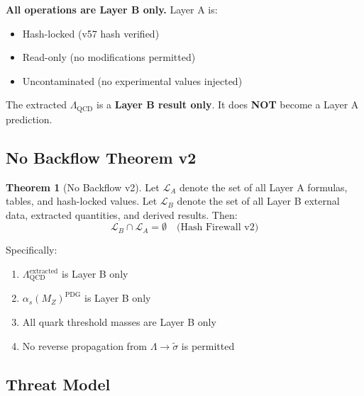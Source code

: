 \documentclass[11pt,a4paper]{article}
\theoremstyle{definition}
\newtheorem{theorem}{Theorem}[section]
\begin{document}
\begin{firewallbox}
\textbf{All operations are Layer B only.} Layer A is:
\begin{itemize}
  \item Hash-locked (v57 hash verified)
  \item Read-only (no modifications permitted)
  \item Uncontaminated (no experimental values injected)
\end{itemize}

The extracted $\Lambda_{\text{QCD}}$ is a \textbf{Layer B result only}.
It does \textbf{NOT} become a Layer A prediction.
\end{firewallbox}

\subsection{No Backflow Theorem v2}
\label{subsec:no-backflow-v2}

\begin{theorem}[No Backflow v2]
\label{thm:no-backflow-v2}
Let $\mathcal{L}_A$ denote the set of all Layer A formulas, tables, and
hash-locked values. Let $\mathcal{L}_B$ denote the set of all Layer B
external data, extracted quantities, and derived results. Then:
\begin{equation}
\label{eq:no-backflow-v2}
\boxed{\mathcal{L}_B \cap \mathcal{L}_A = \emptyset \quad \text{(Hash Firewall v2)}}
\end{equation}

Specifically:
\begin{enumerate}
  \item $\Lambda_{\text{QCD}}^{\text{extracted}}$ is Layer B only
  \item $\alpha_s(M_Z)^{\text{PDG}}$ is Layer B only
  \item All quark threshold masses are Layer B only
  \item No reverse propagation from $\Lambda \to \tilde{\sigma}$ is permitted
\end{enumerate}
\end{theorem}

\subsection{Threat Model}
\label{subsec:threat-model}
\end{document}

